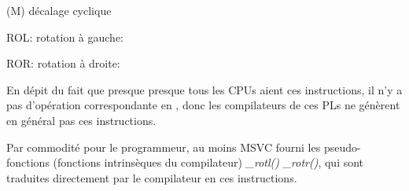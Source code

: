 \label{ROL_ROR}
\item[ROL/ROR] (M) décalage cyclique

ROL: rotation à gauche:



ROR: rotation à droite:



En dépit du fait que presque presque tous les \ac{CPU}s aient ces instructions, il n'y
a pas d'opération correspondante en \CCpp, donc les compilateurs de ces \ac{PL}s
ne génèrent en général pas ces instructions.

Par commodité pour le programmeur, au moins \ac{MSVC} fourni les pseudo-fonctions
(fonctions intrinsèques du compilateur)
\emph{\_rotl()} \AndENRU \emph{\_rotr()}\FNMSDNROTxURL{},
qui sont traduites directement par le compilateur en ces instructions.

